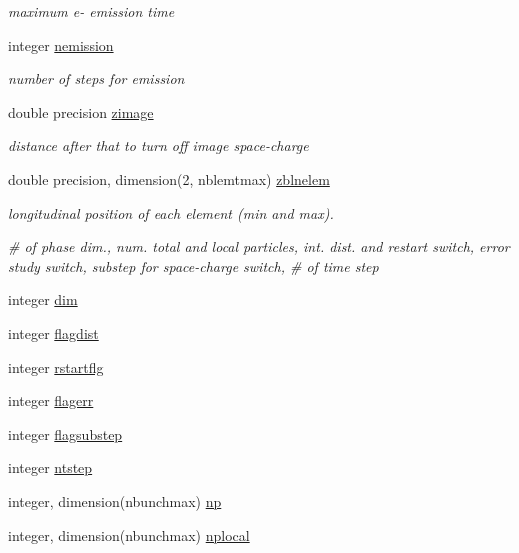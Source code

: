 \begin{DoxyCompactItemize}
\begin{DoxyCompactList}\small\item\em maximum e-\/ emission time \end{DoxyCompactList}\item 
integer \mbox{\hyperlink{namespaceaccsimulatorclass_ac85830b9ae1f5fcb8b361a0289a3642c}{nemission}}
\begin{DoxyCompactList}\small\item\em number of steps for emission \end{DoxyCompactList}\item 
double precision \mbox{\hyperlink{namespaceaccsimulatorclass_ad3a023e393184d37840a4df908394121}{zimage}}
\begin{DoxyCompactList}\small\item\em distance after that to turn off image space-\/charge \end{DoxyCompactList}\item 
double precision, dimension(2, nblemtmax) \mbox{\hyperlink{namespaceaccsimulatorclass_a948cfd87a75472c1a7dd8033d8240cb8}{zblnelem}}
\begin{DoxyCompactList}\small\item\em longitudinal position of each element (min and max). \end{DoxyCompactList}\end{DoxyCompactItemize}
\textbf{ }\par
{\em \# of phase dim., num. total and local particles, int. dist. and restart switch, error study switch, substep for space-\/charge switch, \# of time step }\begin{DoxyCompactItemize}
\item 
integer \mbox{\hyperlink{namespaceaccsimulatorclass_a1bb17d60d29b17243f030da4fdff1da0}{dim}}
\item 
integer \mbox{\hyperlink{namespaceaccsimulatorclass_a341b7d5bedde986513f3acce4e6241c1}{flagdist}}
\item 
integer \mbox{\hyperlink{namespaceaccsimulatorclass_a8f9d158cfc4cf78532f6c4260c64e40b}{rstartflg}}
\item 
integer \mbox{\hyperlink{namespaceaccsimulatorclass_a93593dcb7424a2998a1a96e9b174f886}{flagerr}}
\item 
integer \mbox{\hyperlink{namespaceaccsimulatorclass_a686d2f05ae5ba90a11746493b7344b07}{flagsubstep}}
\item 
integer \mbox{\hyperlink{namespaceaccsimulatorclass_ad17bd82c1342d540df6b01e26bb6a6c5}{ntstep}}
\item 
integer, dimension(nbunchmax) \mbox{\hyperlink{namespaceaccsimulatorclass_a9b5412b4e15fa5ef3285339a39130a08}{np}}
\item 
integer, dimension(nbunchmax) \mbox{\hyperlink{namespaceaccsimulatorclass_a8256e3807dbd57a588c3f79c400a9c04}{nplocal}}
\end{DoxyCompactItemize}


